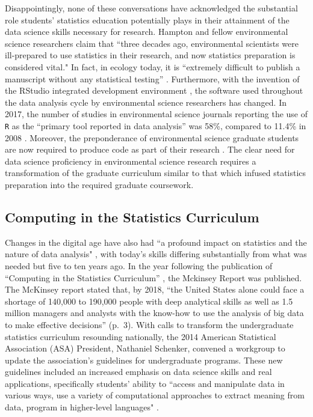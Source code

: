 \documentclass[12pt]{article}
\begin{document}
\quad Disappointingly, none of these conversations have acknowledged the 
substantial role students' statistics education potentially plays in their 
attainment of the data science skills necessary for research. Hampton and 
fellow environmental science researchers claim that ``three decades ago, 
environmental scientists were ill-prepared to use statistics in their research, 
and now statistics preparation is considered vital." In fact, in ecology today,
it is ``extremely difficult to publish a manuscript without any statistical 
testing'' \citep[p. 547]{hampton}. Furthermore, with the invention 
of the RStudio integrated development environment \citep{rstudio}, the software 
used throughout the data analysis cycle by environmental science researchers has
changed. In 2017, the number of studies in environmental science journals 
reporting the use of \texttt{R} as the ``primary tool reported in data 
analysis'' was 58\%, compared to 11.4\% in 2008 \citep[p. 1]{Rpopular}. 
Moreover, the preponderance of environmental science graduate students are now 
required to produce code as part of their research \citep{mislan}. The clear 
need for data science proficiency in environmental science research requires a
transformation of the graduate curriculum similar to that which infused
statistics preparation into the required graduate coursework. 

\subsection{Computing in the Statistics Curriculum}

\quad Changes in the digital age have also had ``a profound impact on statistics
and the nature of data analysis" \citep[p. 97]{nolan}, with today's skills 
differing substantially from what was needed but five to ten years ago. 
In the year following the publication of ``Computing in the Statistics 
Curriculum'' \citep{nolan}, the Mckinsey Report \citep{mckinsey} was published. 
The McKinsey report stated that, by 2018, ``the United States alone could face a
shortage of 140,000 to 190,000 people with deep analytical skills as well as 1.5
million managers and analysts with the know-how to use the analysis of big data
to make effective decisions'' (p.\ 3). With calls to transform the undergraduate
statistics curriculum resounding nationally, the 2014 American Statistical 
Association (ASA) President, Nathaniel Schenker, convened a workgroup to update
the association's guidelines for undergraduate programs. These new guidelines 
included an increased emphasis on data science skills and real applications, 
specifically students' ability to ``access and manipulate data in various ways,
use a variety of computational approaches to extract meaning from data, program
in higher-level languages" \citep[p.\ 7]{asa}. 
\end{document}
